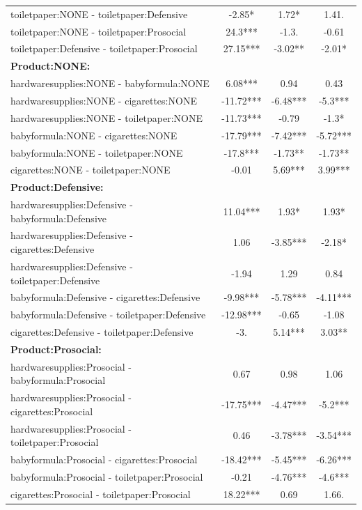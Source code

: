 \documentclass[]{report}
\begin{document}
\begin{table}
{\begin{tabular}[t]{lccc}
			toiletpaper:NONE - toiletpaper:Defensive & -2.85* & 1.72* & 1.41. \\ 
			toiletpaper:NONE - toiletpaper:Prosocial & 24.3*** & -1.3. & -0.61 \\ 
			toiletpaper:Defensive - toiletpaper:Prosocial & 27.15*** & -3.02** & -2.01* \\ 
			\midrule
			\textbf{Product:NONE:} &&&\\
			hardwaresupplies:NONE - babyformula:NONE & 6.08*** & 0.94 & 0.43 \\ 
			hardwaresupplies:NONE - cigarettes:NONE & -11.72*** & -6.48*** & -5.3*** \\ 
			hardwaresupplies:NONE - toiletpaper:NONE & -11.73*** & -0.79 & -1.3* \\ 
			babyformula:NONE - cigarettes:NONE & -17.79*** & -7.42*** & -5.72*** \\ 
			babyformula:NONE - toiletpaper:NONE & -17.8*** & -1.73** & -1.73** \\ 
			cigarettes:NONE - toiletpaper:NONE & -0.01 & 5.69*** & 3.99*** \\ 
			\midrule
			\textbf{Product:Defensive:} &&&\\
			hardwaresupplies:Defensive - babyformula:Defensive & 11.04*** & 1.93* & 1.93* \\ 
			hardwaresupplies:Defensive - cigarettes:Defensive & 1.06 & -3.85*** & -2.18* \\ 
			hardwaresupplies:Defensive - toiletpaper:Defensive & -1.94 & 1.29 & 0.84 \\ 
			babyformula:Defensive - cigarettes:Defensive & -9.98*** & -5.78*** & -4.11*** \\ 
			babyformula:Defensive - toiletpaper:Defensive & -12.98*** & -0.65 & -1.08 \\ 
			cigarettes:Defensive - toiletpaper:Defensive & -3. & 5.14*** & 3.03** \\ 
			\midrule
			\textbf{Product:Prosocial:} &&&\\
			hardwaresupplies:Prosocial - babyformula:Prosocial & 0.67 & 0.98 & 1.06 \\ 
			hardwaresupplies:Prosocial - cigarettes:Prosocial & -17.75*** & -4.47*** & -5.2*** \\ 
			hardwaresupplies:Prosocial - toiletpaper:Prosocial & 0.46 & -3.78*** & -3.54*** \\ 
			babyformula:Prosocial - cigarettes:Prosocial & -18.42*** & -5.45*** & -6.26*** \\ 
			babyformula:Prosocial - toiletpaper:Prosocial & -0.21 & -4.76*** & -4.6*** \\ 
			cigarettes:Prosocial - toiletpaper:Prosocial & 18.22*** & 0.69 & 1.66. \\ 
			\bottomrule
		\end{tabular}}
	\end{table}
	
\end{document}
